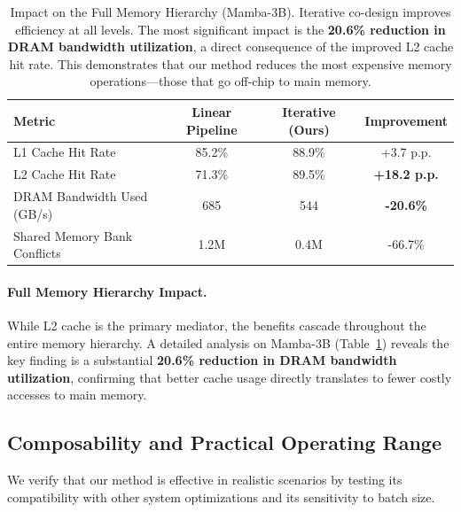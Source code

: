 \documentclass{article}
\begin{document}
\begin{table}[hbt!]
\centering
\caption{Impact on the Full Memory Hierarchy (Mamba-3B). Iterative co-design improves efficiency at all levels. The most significant impact is the \textbf{20.6\% reduction in DRAM bandwidth utilization}, a direct consequence of the improved L2 cache hit rate. This demonstrates that our method reduces the most expensive memory operations—those that go off-chip to main memory.}
\label{tab:memory_hierarchy}
\begin{tabular}{l c c c}
\toprule
\textbf{Metric} & \textbf{Linear Pipeline} & \textbf{Iterative (Ours)} & \textbf{Improvement} \\
\midrule
L1 Cache Hit Rate & 85.2\% & 88.9\% & +3.7 p.p. \\
L2 Cache Hit Rate & 71.3\% & 89.5\% & \textbf{+18.2 p.p.} \\
DRAM Bandwidth Used (GB/s) & 685 & 544 & \textbf{-20.6\%} \\
Shared Memory Bank Conflicts & 1.2M & 0.4M & -66.7\% \\
\bottomrule
\end{tabular}
\end{table}


\paragraph{Full Memory Hierarchy Impact.}
While L2 cache is the primary mediator, the benefits cascade throughout the entire memory hierarchy. A detailed analysis on Mamba-3B (Table~\ref{tab:memory_hierarchy}) reveals the key finding is a substantial \textbf{20.6\% reduction in DRAM bandwidth utilization}, confirming that better cache usage directly translates to fewer costly accesses to main memory.

\subsection{Composability and Practical Operating Range}
We verify that our method is effective in realistic scenarios by testing its compatibility with other system optimizations and its sensitivity to batch size.
\end{document}
